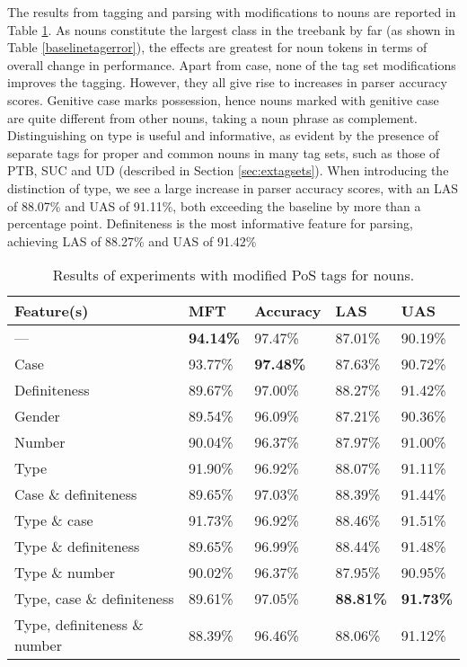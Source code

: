 \documentclass[a4paper,12pt,english]{book}
\begin{document}
The results from tagging and parsing with modifications to nouns are reported
in Table \ref{substresults}. As nouns constitute the largest class in the
treebank by far (as shown in Table \ref{baselinetagerror}), the effects are
greatest for noun tokens in terms of overall change in performance. Apart from
case, none of the tag set modifications improves the tagging. However, they all
give rise to increases in parser accuracy scores. Genitive case marks
possession, hence nouns marked with genitive case are quite different from
other nouns, taking a noun phrase as complement. Distinguishing on type is
useful and informative, as evident by the presence of separate tags for proper
and common nouns in many tag sets, such as those of PTB, SUC and UD (described
in Section \ref{sec:extagsets}). When introducing the distinction of type, we
see a large increase in parser accuracy scores, with an LAS of 88.07\% and UAS
of 91.11\%, both exceeding the baseline by more than a percentage point.
Definiteness is the most informative feature for parsing, achieving LAS of
88.27\% and UAS of 91.42\%

\begin{table}
    \centering
    \smaller[0.5]
    \begin{tabular}{@{}lllll@{}}
        \toprule
        \textbf{Feature(s)} & \textbf{MFT} & \textbf{Accuracy} &
        \textbf{LAS} & \textbf{UAS} \\
        \midrule
        --- & \textbf{94.14\%} & 97.47\% & 87.01\% & 90.19\% \\
        Case & 93.77\% & \textbf{97.48\%} & 87.63\% & 90.72\% \\
        Definiteness & 89.67\% & 97.00\% & 88.27\% & 91.42\% \\
        Gender & 89.54\% & 96.09\% & 87.21\% & 90.36\% \\
        Number & 90.04\% & 96.37\% & 87.97\% & 91.00\% \\
        Type & 91.90\% & 96.92\% & 88.07\% & 91.11\% \\
        Case \& definiteness & 89.65\% & 97.03\% & 88.39\% & 91.44\% \\
        Type \& case & 91.73\% & 96.92\% & 88.46\% & 91.51\% \\
        Type \& definiteness & 89.65\% & 96.99\% & 88.44\% & 91.48\% \\
        Type \& number & 90.02\% & 96.37\% & 87.95\% & 90.95\% \\
        Type, case \& definiteness & 89.61\% & 97.05\% & \textbf{88.81\%} &
        \textbf{91.73\%} \\
        Type, definiteness \& number & 88.39\% & 96.46\% & 88.06\% & 91.12\%
        \\
        \bottomrule
    \end{tabular}
    \caption{Results of experiments with modified PoS tags for nouns.}
    \label{substresults}
\end{table}
\end{document}
